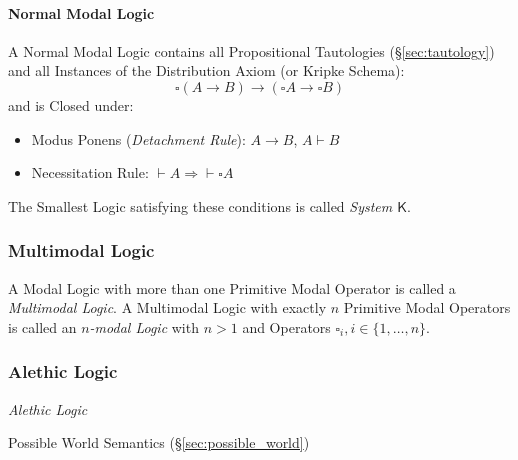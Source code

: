 \paragraph{Normal Modal Logic}\label{sec:normal_modal}\hfill

A Normal Modal Logic contains all Propositional Tautologies
(\S\ref{sec:tautology}) and all Instances of the Distribution Axiom
(or Kripke Schema):
\[
  \square (A \rightarrow B) \rightarrow
  (\square A \rightarrow \square B)
\]
and is Closed under:
\begin{itemize}
  \item Modus Ponens (\emph{Detachment Rule}): $A \rightarrow B$, $A
    \vdash B$
  \item Necessitation Rule: $\vdash A \Rightarrow \vdash \square A$
\end{itemize}
The Smallest Logic satisfying these conditions is called \emph{System
  $\mathsf{K}$}.



\subsubsection{Multimodal Logic}\label{sec:multimodal_logic}

A Modal Logic with more than one Primitive Modal Operator is called a
\emph{Multimodal Logic}. A Multimodal Logic with exactly $n$ Primitive
Modal Operators is called an \emph{$n$-modal Logic} with $n > 1$ and
Operators $\square_i, i \in \{1, \ldots, n\}$.



\subsubsection{Alethic Logic}\label{sec:alethic_logic}

\emph{Alethic Logic}

Possible World Semantics (\S\ref{sec:possible_world})


